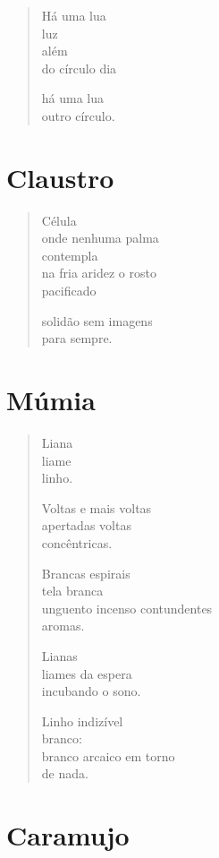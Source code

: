 \begin{verse}
Há uma lua\\
luz\\
além\\
do círculo dia

há uma lua\\
outro círculo.
\end{verse}

\chapter{Claustro}

\begin{verse}
Célula\\
onde nenhuma palma\\
contempla\\
na fria aridez o rosto\\
pacificado

solidão sem imagens\\
para sempre.
\end{verse}

\chapter{Múmia}

\begin{verse}
Liana\\
liame\\
linho.

Voltas e mais voltas\\
apertadas voltas\\
concêntricas.

Brancas espirais\\
tela branca\\
unguento incenso contundentes\\
aromas.

Lianas\\
liames da espera\\
incubando o sono.

Linho indizível\\
branco:\\
branco arcaico em torno\\
de nada.
\end{verse}

\chapter{Caramujo}


